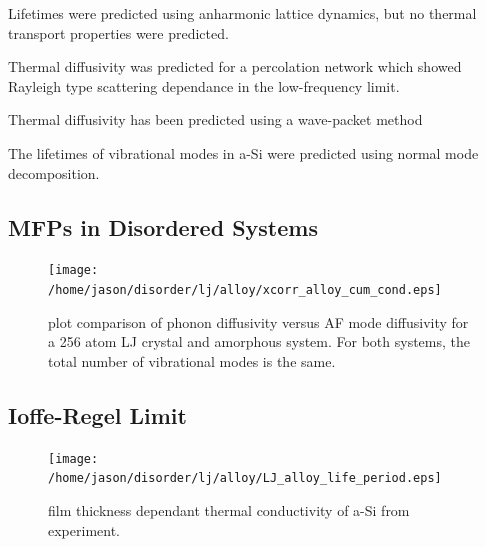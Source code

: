 \documentclass[aps,prb,preprint,superscriptaddress,amsmath,amssymb,floatfix]{revtex4}
\begin{document}
Lifetimes were predicted using anharmonic lattice dynamics, but no thermal 
transport properties were predicted.\cite{fabian_anharmonic_1996}

Thermal diffusivity was predicted for a percolation network which showed 
Rayleigh type scattering dependance in the low-frequency limit.
\cite{sheng_heat_1991}

Thermal diffusivity has been predicted using a wave-packet method

The lifetimes of vibrational modes in a-Si were predicted using normal 
mode decomposition.\cite{he_heat_2011}

\subsection{\label{S:Lifetimes:}MFPs in Disordered Systems}

\begin{figure}
\begin{center}
\texttt{[image: /home/jason/disorder/lj/alloy/xcorr\_alloy\_cum\_cond.eps]}
\vspace*{-5mm}
\end{center}
\caption{\label{FIG:phonon_diff} plot comparison of phonon diffusivity 
versus AF mode diffusivity for a 256 atom LJ crystal and amorphous system. 
For both systems, the total number of vibrational modes is the same.}
\end{figure}

\vspace*{100mm}

\subsection{\label{S:Lifetimes:}Ioffe-Regel Limit}

\begin{figure}
\begin{center}
\texttt{[image: /home/jason/disorder/lj/alloy/LJ\_alloy\_life\_period.eps]}
\vspace*{-5mm}
\end{center}
\caption{\label{FIG:phonon_diff} film thickness dependant thermal 
conductivity of a-Si from experiment.}
\end{figure}
\end{document}
